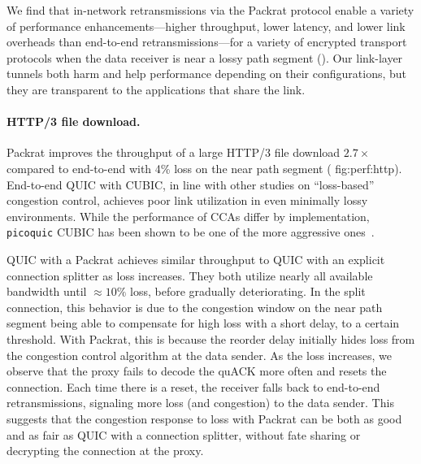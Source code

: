 We find that
in-network retransmissions via the Packrat protocol enable a variety of performance
enhancements---higher throughput, lower latency, and lower link overheads than
end-to-end retransmissions---for a variety of encrypted transport protocols
when the data receiver is near a lossy path segment ().
Our link-layer tunnels both harm and help performance depending on their
configurations, but they are transparent to the applications that share the link.

\paragraph{HTTP/3 file download.}
Packrat improves the throughput of a large HTTP/3 file download
$2.7\times$
compared to end-to-end with 4\% loss on the near path segment (\Cref
{fig:perf:http}). End-to-end QUIC with CUBIC, in line with other studies on
``loss-based'' congestion control, achieves poor link utilization in even
minimally lossy environments. While the performance of CCAs differ by
implementation, \texttt{picoquic} CUBIC has been shown to be one of the more
aggressive ones~\cite{yuan2025internet}.

QUIC with a Packrat achieves similar throughput to QUIC with an explicit
connection splitter as loss increases. They both utilize nearly all available
bandwidth until $\approx\!10\%$ loss, before gradually deteriorating. In the
split connection, this behavior is due to the congestion window on the near
path segment being able to compensate for high loss with a short delay, to a
certain threshold. With Packrat, this is because the reorder delay initially
hides loss from the congestion control algorithm at the data sender. As the
loss increases, we observe that the proxy fails to decode the quACK more often
and resets the connection. Each time there is a reset, the receiver falls back
to end-to-end retransmissions, signaling more loss (and congestion) to the data
sender. This suggests that the congestion response to loss with Packrat can be
both as good and as fair as QUIC with a connection splitter, without fate
sharing or decrypting the connection at the proxy.

